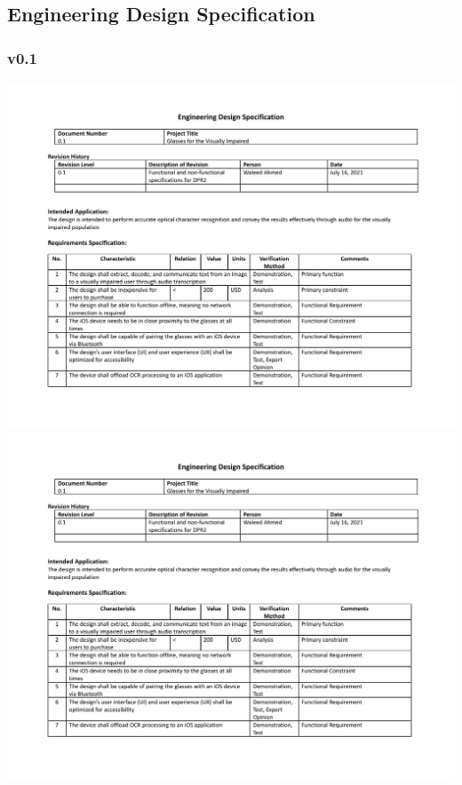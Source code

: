 \documentclass[a4paper,11pt]{article}
\begin{document}
\newpage
\begin{landscape}
    \subsection{Engineering Design Specification}
    \subsubsection{v0.1}
    \begin{center}
        \includegraphics[page=1,width={0.86\linewidth}]{pdf/eds_0.1.pdf}
        \newpage
        \includegraphics[page=2,width={0.86\linewidth}]{pdf/eds_0.1.pdf}
    \end{center}
    

\end{landscape}
\end{document}
